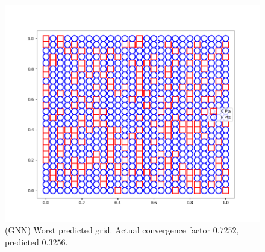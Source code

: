 \begin{figure}[h]
  \centering
  \includegraphics[scale=0.5]{figures/recircflow/gnn_grid_worst.png}
  \caption{(GNN) Worst predicted grid.  Actual convergence factor $0.7252$, predicted $0.3256$.}
  \label{fig:train}
\end{figure}


